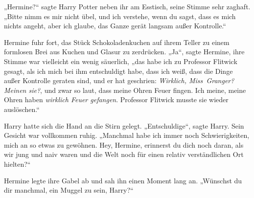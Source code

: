 „Hermine?“ sagte Harry Potter neben ihr am Esstisch, seine Stimme sehr zaghaft.
„Bitte nimm es mir nicht übel, und ich verstehe, wenn du sagst, dass es mich nichts angeht, aber ich glaube, das Ganze gerät langsam außer Kontrolle.“

Hermine fuhr fort, das Stück Schokoladenkuchen auf ihrem Teller zu einem formlosen Brei aus Kuchen und Glasur zu zerdrücken.
„Ja“, sagte Hermine, ihre Stimme war vielleicht ein wenig säuerlich, „das habe ich zu Professor Flitwick gesagt, als ich mich bei ihm entschuldigt habe, dass ich weiß, dass die Dinge außer Kontrolle geraten sind, und er hat geschrien: \emph{Wirklich, Miss~Granger? Meinen sie?}, und zwar so laut, dass meine Ohren Feuer fingen. Ich meine, meine Ohren haben \emph{wirklich Feuer gefangen}. Professor Flitwick musste sie wieder auslöschen.“

Harry hatte sich die Hand an die Stirn gelegt.
„Entschuldige“, sagte Harry. Sein Gesicht war vollkommen ruhig.
„Manchmal habe ich immer noch Schwierigkeiten, mich an so etwas zu gewöhnen. Hey, Hermine, erinnerst du dich noch daran, als wir jung und naiv waren und die Welt noch für einen relativ verständlichen Ort hielten?“

Hermine legte ihre Gabel ab und sah ihn einen Moment lang an.
„Wünschst du dir manchmal, ein Muggel zu sein, Harry?“

